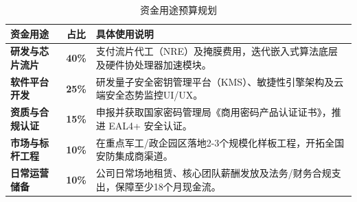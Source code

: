 \begin{table}[H]
	\centering
	\caption{资金用途预算规划}
	\label{tab:fund_usage}
	\renewcommand{\arraystretch}{1.4}
	\begin{tabular}{p{3cm}cp{8.5cm}}
		\toprule
		\textbf{资金用途} & \textbf{占比} & \textbf{具体使用说明} \\
		\midrule
		\textbf{研发与芯片流片} & \textbf{40\%} & 支付流片代工（NRE）及掩膜费用，迭代嵌入式算法底层及硬件协处理器加速模块。 \\
		\textbf{软件平台开发} & \textbf{25\%} & 研发量子安全密钥管理平台（KMS）、敏捷性引擎架构及云端安全态势监控UI/UX。 \\
		\textbf{资质与合规认证} & \textbf{15\%} & 申报并获取国家密码管理局《商用密码产品认证证书》，推进 EAL4+ 安全认证。 \\
		\textbf{市场与标杆工程} & \textbf{10\%} & 在重点军工/政企园区落地2-3个规模化样板工程，开拓全国安防集成商渠道。 \\
		\textbf{日常运营储备} & \textbf{10\%} & 公司日常场地租赁、核心团队薪酬发放及法务/财务合规支出，保障至少18个月现金流。 \\
		\bottomrule
	\end{tabular}
\end{table}

